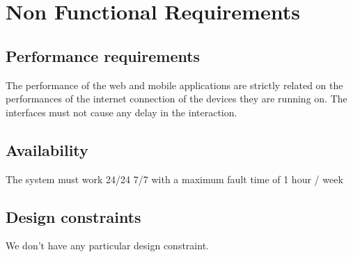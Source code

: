 \pagebreak
\section{Non Functional Requirements}
\subsection{Performance requirements}
The performance of the web and mobile applications are strictly related on the performances of the internet connection of the devices they are running on. The interfaces must not cause any delay in the interaction.
\subsection{Availability}
The system must work 24/24 7/7 with a maximum fault time of 1 hour / week
\subsection{Design constraints}
We don't have any particular design constraint.